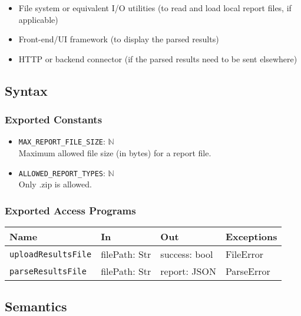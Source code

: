 \documentclass[12pt, titlepage]{article}
\begin{document}
\begin{itemize}
\begin{itemize}
    \item File system or equivalent I/O utilities (to read and load local report files, if applicable)
    \item Front-end/UI framework (to display the parsed results)
    \item HTTP or backend connector (if the parsed results need to be sent elsewhere)
\end{itemize}

\subsection{Syntax}

\subsubsection{Exported Constants}

\begin{itemize}
    \item \texttt{MAX\_REPORT\_FILE\_SIZE}: $\mathbb{N}$ \\
     Maximum allowed file size (in bytes) for a report file.
    \item \texttt{ALLOWED\_REPORT\_TYPES}: $\mathbb{N}$ \\
     Only .zip is allowed.
\end{itemize}

\subsubsection{Exported Access Programs}

\begin{center}
\begin{tabular}{p{5cm} p{3.5cm} p{3.5cm} p{2cm}}
\hline
\textbf{Name} & \textbf{In} & \textbf{Out} & \textbf{Exceptions} \\
\hline
\texttt{uploadResultsFile} & filePath: Str & success: bool & FileError \\
\texttt{parseResultsFile} & filePath: Str & report: JSON & ParseError \\
\hline
\end{tabular}
\end{center}

\subsection{Semantics}


\end{itemize}
\end{document}
